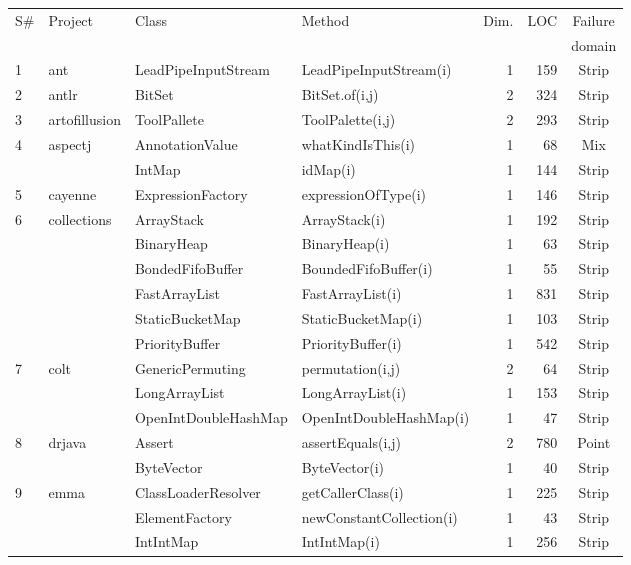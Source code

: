 \begin{table}[H]
{{\begin{tabular}{|l|l|l|l|r|r|c|}
S\# 	& 	Project 		& Class					& Method 				& Dim.   		& LOC 	& Failure 							\\
	&				&						&						&			&		& domain							\\
\hline
1	&	ant			& LeadPipeInputStream	& LeadPipeInputStream(i) 	& 1			& 159	& Strip     									\\ 
2	&	antlr		& BitSet					& BitSet.of(i,j)			& 2			& 324	& Strip 	 									\\
3	&	artofillusion	& ToolPallete			  	& ToolPalette(i,j)			& 2			& 293	& Strip										\\ 
4	&	aspectj		& AnnotationValue	  	& whatKindIsThis(i)		& 1			& 68	& Mix										\\ 
	&				& IntMap			  	& idMap(i)				& 1			& 144	& Strip										\\ 
5	&	cayenne		& ExpressionFactory	  	& expressionOfType(i)	& 1			& 146	& Strip										\\ 
6	&	collections	& ArrayStack				& ArrayStack(i)			& 1			& 192	& Strip  										\\ 
	&				& BinaryHeap			& BinaryHeap(i)			& 1			& 63	& Strip  										\\
	&				& BondedFifoBuffer		& BoundedFifoBuffer(i)	& 1			& 55	& Strip  										\\
	&				& FastArrayList			& FastArrayList(i)			& 1			& 831	& Strip  										\\ 
	&				& StaticBucketMap		& StaticBucketMap(i)		& 1			& 103	& Strip  										\\ 
	&				& PriorityBuffer			& PriorityBuffer(i)			& 1			& 542	& Strip  										\\ 
7	&	colt			& GenericPermuting		& permutation(i,j)		& 2			& 64	& Strip  										\\ 
	&				& LongArrayList			& LongArrayList(i)		& 1			& 153	& Strip  										\\ 
	&				& OpenIntDoubleHashMap& OpenIntDoubleHashMap(i) & 1		& 47	& Strip  										\\ 
8	&	drjava		& Assert					& assertEquals(i,j)		& 2			& 780	& Point										\\ 
	&				& ByteVector				& ByteVector(i)			& 1			& 40	& Strip  										\\ 			
9	&	emma		& ClassLoaderResolver	& getCallerClass(i)		& 1			& 225	& Strip										\\ 
	&				& ElementFactory			& newConstantCollection(i)& 1			& 43	& Strip  										 \\ 
	&				& IntIntMap				& IntIntMap(i)			& 1			& 256	& Strip										\\ 

\end{tabular}}}
\end{table}
